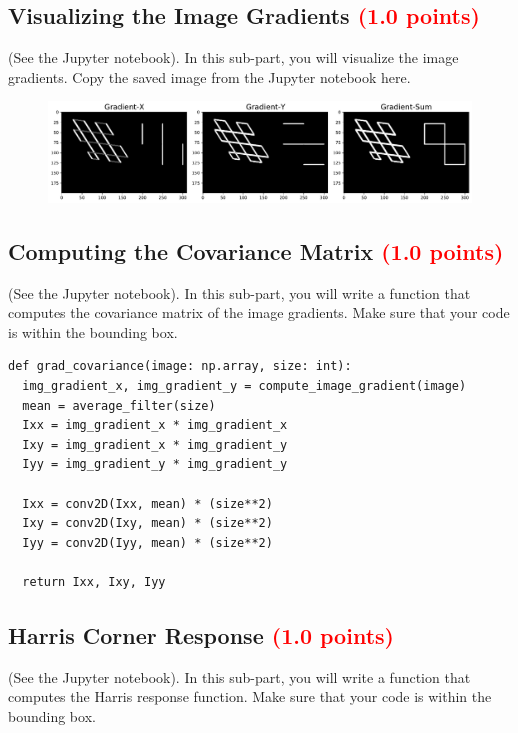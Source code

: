 \documentclass[answers]{exam}
\newcommand{\mypoints}[1]{\textcolor{red}{(#1 points)}}
\begin{document}
\subsection{Visualizing the Image Gradients \mypoints{1.0}}
(See the Jupyter notebook). In this sub-part, you will visualize the image gradients. Copy the saved image from the Jupyter notebook here.

\begin{solution}
\begin{figure}[H]
    \centering
    \includegraphics[width=\linewidth]{Images/question_3_2.pdf}
\end{figure}
\end{solution}

\subsection{Computing the Covariance Matrix \mypoints{1.0}}
(See the Jupyter notebook). In this sub-part, you will write a function that computes the covariance matrix of the image gradients. Make sure that your code is within the bounding box.

\begin{solution}
\begin{verbatim}
def grad_covariance(image: np.array, size: int):
  img_gradient_x, img_gradient_y = compute_image_gradient(image)
  mean = average_filter(size)
  Ixx = img_gradient_x * img_gradient_x
  Ixy = img_gradient_x * img_gradient_y
  Iyy = img_gradient_y * img_gradient_y

  Ixx = conv2D(Ixx, mean) * (size**2)
  Ixy = conv2D(Ixy, mean) * (size**2)
  Iyy = conv2D(Iyy, mean) * (size**2)
  
  return Ixx, Ixy, Iyy
\end{verbatim}
\end{solution}

\subsection{Harris Corner Response \mypoints{1.0}}
(See the Jupyter notebook). In this sub-part, you will write a function that computes the Harris response function. Make sure that your code is within the bounding box.
\end{document}
